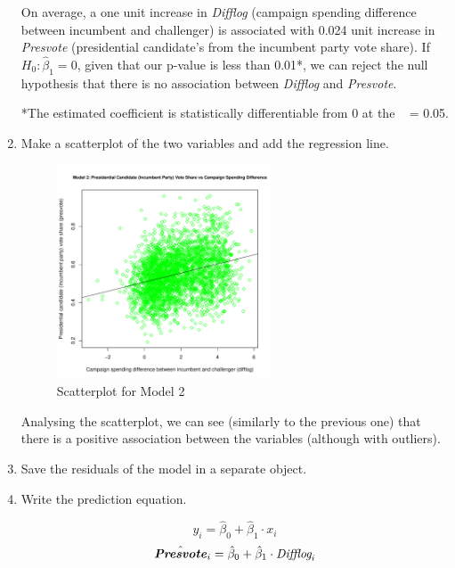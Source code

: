 \documentclass[12pt,letterpaper]{article}
\begin{document}
\begin{enumerate}
 On average, a one unit increase in \textit{Difflog} (campaign spending difference between incumbent and challenger) is associated with 0.024 unit increase in \textit{Presvote} (presidential candidate's from the incumbent party vote share). If \(H_0: \hat{\beta}_1 = 0\), given that our p-value is less than 0.01*, we can reject the null hypothesis that there is no association between \textit{Difflog} and \textit{Presvote}. 
 
 *The estimated coefficient is statistically differentiable from 0 at the \alpha \  = 0.05. 
 
		\item Make a scatterplot of the two variables and add the regression line.
		
				  
		
			\begin{figure}[H]
			\centering
			\includegraphics[width=0.6\textwidth]{02.PS03_Skrypnyk_Plot2.pdf}
			\caption{Scatterplot for Model 2}
			\label{fig:Plot2}
		\end{figure}
		
Analysing the scatterplot, we can see (similarly to the previous one) that there is a positive association between the variables (although with outliers). 

		\item Save the residuals of the model in a separate object.	
		
			  
			
		\item Write the prediction equation.
	\begin{center}
		
		\[
		\hat{y_i} = \hat{\beta}_0 + \hat{\beta}_1 \cdot x_i
		\]
		\[\hat{\textbf{\textit{Presvote}}}_i  = \hat{\beta}_0 + \hat{\beta}_1 \cdot  \textit{Difflog}_i
		\]
	\end{center}
		

\end{enumerate}
\end{document}
